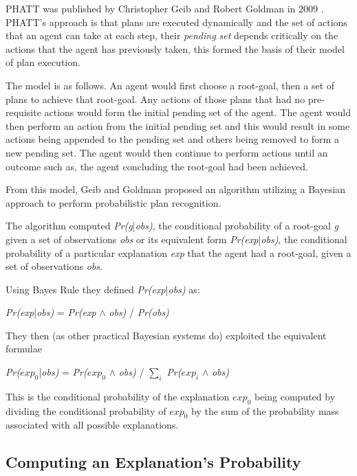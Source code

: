 \documentclass[parskip]{cs4rep}
\begin{document}
PHATT was published by Christopher Geib and Robert Goldman in 2009 \cite{Geib:2009:PPR:1550966.1551246}. PHATT's approach is that plans are executed dynamically and the set of actions that an agent can take at each step, their \textit{pending set} depends critically on the actions that the agent has previously taken, this formed the basis of their model of plan execution.

The model is as follows. An agent would first choose a root-goal, then a set of plans to achieve that root-goal. Any actions of those plans that had no pre-requisite actions would form the initial pending set of the agent. The agent would then perform an action from the initial pending set and this would result in some actions being appended to the pending set and others being removed to form a new pending set. The agent would then continue to perform actions until an outcome such as, the agent concluding the root-goal had been achieved.

From this model, Geib and Goldman proposed an algorithm utilizing a Bayesian approach to perform probabilistic plan recognition. 

The algorithm computed \textit{Pr(g}|\textit{obs)}, the conditional probability of a root-goal \textit{g} given a set of observations \textit{obs} or its equivalent form \textit{Pr(exp}|\textit{obs)}, the conditional probability of a particular explanation \textit{exp} that the agent had a root-goal, given a set of observations \textit{obs}.

Using Bayes Rule they defined \textit{Pr(exp}|\textit{obs)} as:\newline

\centerline{
\textit{Pr(exp}|\textit{obs)} = \textit{Pr(exp} $\wedge$ \textit{obs)} / \textit{Pr(obs)}
}

They then (as other practical Bayesian systems do) exploited the equivalent formulae\newline

\centerline{
\textit{Pr($exp_0$}|\textit{obs)} = \textit{Pr($exp_0$} $\wedge$ \textit{obs)} / $\displaystyle\sum\nolimits_{i}$ \textit{Pr($exp_i$} $\wedge$ \textit{obs)}
}

This is the conditional probability of the explanation $exp_0$ being computed by dividing the conditional probability of $exp_0$  by the sum of the probability mass associated with all possible explanations.

\subsection{Computing an Explanation's Probability}
\end{document}
